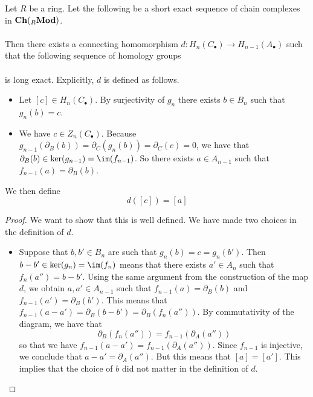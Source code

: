\documentclass[a4paper]{article}
\begin{document}
\begin{thm}{}{} Let $R$ be a ring. Let the following be a short exact sequence of chain complexes in $\bold{Ch}({_R\bold{Mod}})$. \\
\\
Then there exists a connecting homomorphism $d:H_n(C_\bullet)\to H_{n-1}(A_\bullet)$ such that the following sequence of homology groups \\
\\
is long exact. Explicitly, $d$ is defined as follows. 
\begin{itemize}
\item Let $[c]\in H_n(C_\bullet)$. By surjectivity of $g_n$ there exists $b\in B_n$ such that $g_n(b)=c$. 
\item We have $c\in Z_n(C_\bullet)$. Because $g_{n-1}(\partial_B(b))=\partial_C(g_n(b))=\partial_C(c)=0$, we have that $\partial_B(b)\in\ker(g_{n-1})=\im(f_{n-1})$. So there exists $a\in A_{n-1}$ such that $f_{n-1}(a)=\partial_B(b)$. 
\end{itemize} 
We then define $$d([c])=[a]$$ 
\begin{proof}
We want to show that this is well defined. We have made two choices in the definition of $d$. 
\begin{itemize}
\item Suppose that $b,b'\in B_n$ are such that $g_n(b)=c=g_n(b')$. Then $b-b'\in\ker(g_n)=\im(f_n)$ means that there exists $a'\in A_n$ such that $f_n(a'')=b-b'$. Using the same argument from the construction of the map $d$, we obtain $a,a'\in A_{n-1}$ such that $f_{n-1}(a)=\partial_B(b)$ and $f_{n-1}(a')=\partial_B(b')$. This means that $f_{n-1}(a-a')=\partial_B(b-b')=\partial_B(f_n(a''))$. By commutativity of the diagram, we have that $$\partial_B(f_n(a''))=f_{n-1}(\partial_A(a''))$$ so that we have $f_{n-1}(a-a')=f_{n-1}(\partial_A(a''))$. Since $f_{n-1}$ is injective, we conclude that $a-a'=\partial_A(a'')$. But this means that $[a]=[a']$. This implies that the choice of $b$ did not matter in the definition of $d$. 

\end{itemize}
\end{proof}
\end{thm}
\end{document}
